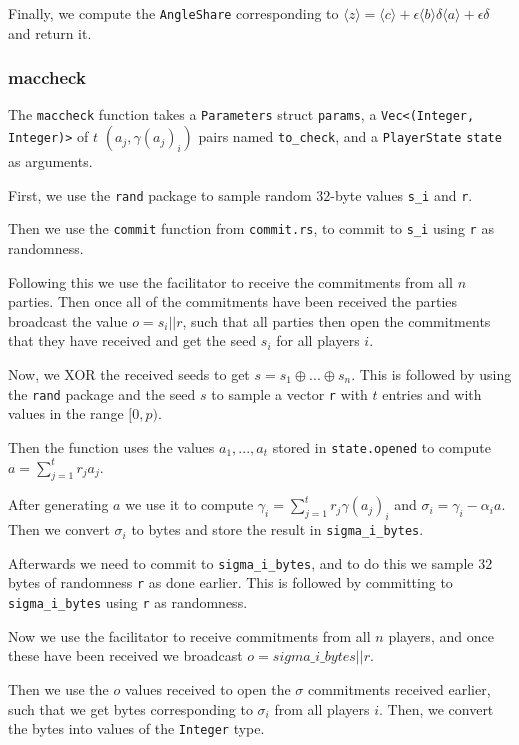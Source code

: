 \documentclass[../main.tex]{subfiles}
\begin{document}
Finally, we compute the \lstinline{AngleShare} corresponding to $\langle z \rangle = \langle c \rangle + \epsilon \langle b \rangle \delta \langle a \rangle + \epsilon \delta$ and return it.
\subsubsection{maccheck}
The \lstinline{maccheck} function takes a \lstinline{Parameters} struct \lstinline{params}, a \lstinline{Vec<(Integer, Integer)>} of $t$ $(a_j, \gamma(a_j)_i)$ pairs named \lstinline{to_check}, and a \lstinline{PlayerState} \lstinline{state} as arguments.

First, we use the \lstinline{rand} package to sample random $32$-byte values  \lstinline{s_i} and \lstinline{r}.

Then we use the \lstinline{commit} function from \lstinline{commit.rs}, to commit to \lstinline{s_i} using \lstinline{r} as randomness.

Following this we use the facilitator to receive the commitments from all $n$ parties. Then once all of the commitments have been received the parties broadcast the value $o = s_i || r$, such that all parties then open the commitments that they have received and get the seed $s_i$ for all players $i$.

Now, we XOR the received seeds to get $s = s_1 \oplus ... \oplus s_n$. This is followed by using the \lstinline{rand} package and the seed $s$ to sample a vector \lstinline{r} with $t$ entries and with values in the range $[0, p)$.

Then the function uses the values $a_1, ..., a_t$ stored in \lstinline{state.opened} to compute $a = \sum^t_{j = 1} r_j a_j$.

After generating $a$ we use it to compute $\gamma_i = \sum^t_{j = 1} r_j \gamma(a_j)_i$ and $\sigma_i = \gamma_i - \alpha_i a$. Then we convert $\sigma_i$ to bytes and store the result in \lstinline{sigma_i_bytes}.

Afterwards we need to commit to \lstinline{sigma_i_bytes}, and to do this we sample $32$ bytes of randomness \lstinline{r} as done earlier. This is followed by committing to \lstinline{sigma_i_bytes} using \lstinline{r} as randomness.

Now we use the facilitator to receive commitments from all $n$ players, and once these have been received we broadcast $o = sigma\_i\_bytes || r$.

Then we use the $o$ values received to open the $\sigma$ commitments received earlier, such that we get bytes corresponding to $\sigma_i$ from all players $i$. Then, we convert the bytes into values of the \lstinline{Integer} type.
\end{document}
